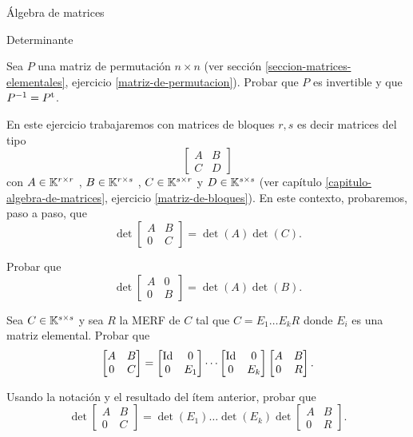 \begin{chapter}{\'Algebra de matrices}
\begin{section}{Determinante}
\begin{enumex}
    \item Sea $P$ una matriz de permutación $n \times n$ (ver sección \ref{seccion-matrices-elementales}, ejercicio \ref{matriz-de-permutacion}). Probar que $P$  es invertible y que $P^{-1} = P^{\operatorname{t}}$. 
    \item En  este ejercicio trabajaremos  con matrices de bloques $r,s$ es decir matrices del tipo 
    $$
    \begin{bmatrix} A &B \\ C & D \end{bmatrix}
    $$ 
    con $A \in \mathbb K^{r \times r}$ ,  $B \in \mathbb K^{r \times s}$ ,  $C \in \mathbb K^{s \times r}$ y  $D \in \mathbb K^{s \times s}$ (ver capítulo  \ref{capitulo-algebra-de-matrices},  ejercicio \ref{matriz-de-bloques}). En  este contexto, probaremos, paso a paso, que 
     \begin{equation}\label{det-matriz-bloques-triang}
        \det \begin{bmatrix} A &B \\ 0 & C \end{bmatrix} = \det(A)\det(C).
     \end{equation}
    \begin{enumex}
        \item Probar que 
        $$
        \det \begin{bmatrix} A &0 \\ 0 & B \end{bmatrix} = \det(A)\det(B).
        $$
        \item Sea $C \in \mathbb K^{s \times s}$  y sea $R$ la MERF de $C$ tal que $C = E_1\ldots E_k R$ donde $E_i$  es una matriz elemental. Probar que 
        $$
        \begin{bmatrix} A &B \\ 0 & C \end{bmatrix} =  \begin{bmatrix} \operatorname{Id}  &0 \\ 0 & E_1\end{bmatrix} \cdots \begin{bmatrix} \operatorname{Id}  &0 \\ 0 & E_k \end{bmatrix} \begin{bmatrix} A  &B \\ 0 & R \end{bmatrix}.
        $$
        \item Usando la notación y el resultado del ítem anterior, probar que 
        $$
        \det \begin{bmatrix} A &B \\ 0 & C \end{bmatrix} = \det(E_1) \ldots \det(E_k) \det \begin{bmatrix} A  &B \\ 0 & R \end{bmatrix}.
$$
\end{enumex}
\end{enumex}
\end{section}
\end{chapter}
